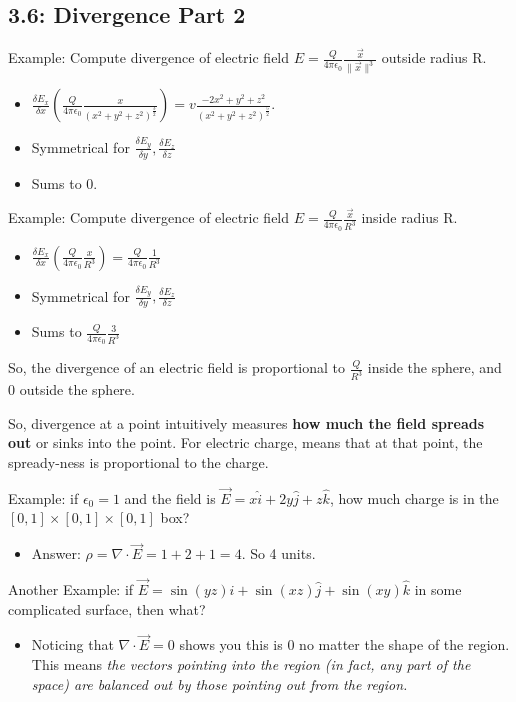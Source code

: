 \documentclass[11pt, oneside]{article}   	%
\begin{document}
\subsection{3.6:  Divergence Part 2}

Example: Compute divergence of electric field $E = \frac{Q}{4 \pi \epsilon_0}\frac{\vec{x}}{\| \vec{x} \|^3}$ outside radius R.
\begin{itemize}
\item $\frac{\delta E_x}{\delta x} (\frac{Q}{4 \pi \epsilon_0}\frac{x}{(x^2 + y^2 + z^2)^\frac{3}{2}}) = v\frac{-2x^2 + y^2 + z^2}{(x^2 + y^2 + z^2)^\frac{5}{2}}$.
\item Symmetrical for $\frac{\delta E_y}{\delta y}, \frac{\delta E_z}{\delta z}$
\item Sums to 0.
\end{itemize}

Example: Compute divergence of electric field $E = \frac{Q}{4 \pi \epsilon_0}\frac{\vec{x}}{R^3}$ inside radius R.
\begin{itemize}
\item $\frac{\delta E_x}{\delta x} (\frac{Q}{4 \pi \epsilon_0}\frac{x}{R^3}) =  \frac{Q}{4 \pi \epsilon_0}\frac{1}{R^3}$
\item Symmetrical for $\frac{\delta E_y}{\delta y}, \frac{\delta E_z}{\delta z}$
\item Sums to $\frac{Q}{4 \pi \epsilon_0}\frac{3}{R^3}$
\end{itemize}

So, the divergence of an electric field is proportional to $\frac{Q}{R^3}$ inside the sphere, and 0 outside the sphere.  

So, divergence at a point intuitively measures \textbf{how much the field spreads out} or sinks into the point.  For electric charge, 
 means that at that point, the spready-ness is proportional to the charge.

Example: if $\epsilon_0 = 1$ and the field is $\vec{E} = x \hat{i} + 2y \hat{j} + z \hat {k}$, how much charge is in the $[0,1] \times [0,1] \times [0,1]$ box?
\begin{itemize}
\item	Answer: $\rho = \nabla \cdot \vec{E} = 1 + 2 + 1 = 4$.  So 4 units.
\end{itemize}


Another Example: if $\vec{E} = \sin(yz) \hat{i} + \sin(xz) \hat{j} + \sin(xy) \hat {k}$ in some complicated surface, then what?
\begin{itemize}
\item	Noticing that $\nabla \cdot \vec{E} = 0$ shows you this is 0 no matter the shape of the region.  This means \emph{the vectors pointing into the region (in fact, any part of the space) are balanced out by those pointing out from the region.}
\end{itemize}
\end{document}
